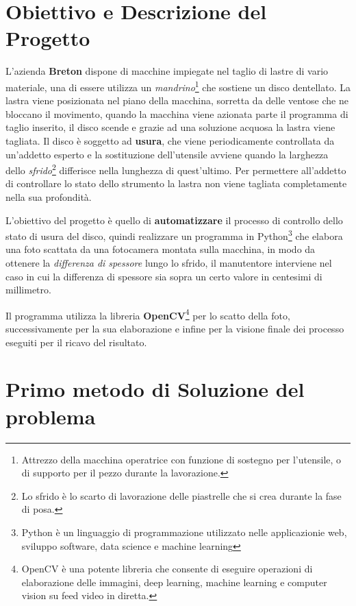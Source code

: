 \documentclass[a4paper, notitlepage, 12pt]{article}
\begin{document}
    \section{Obiettivo e Descrizione  del Progetto}\par
        \noindent L'azienda \textbf{Breton} dispone di macchine impiegate nel taglio di lastre di vario materiale,
        una di essere utilizza un \emph{mandrino}\footnote[0]{\indent Attrezzo della macchina operatrice con funzione di sostegno per l'utensile, o di supporto per il pezzo durante la lavorazione.} che sostiene un disco dentellato.
        La lastra viene posizionata nel piano della macchina, sorretta da delle ventose che ne bloccano il movimento,
        quando la macchina viene azionata parte il programma di taglio inserito, il disco scende e grazie ad una
        soluzione acquosa la lastra viene tagliata. Il disco è soggetto ad \textbf{usura}, che viene periodicamente controllata da un'addetto esperto e la 
        sostituzione dell'utensile avviene quando la larghezza dello \emph{sfrido}\footnote[1]{\indent Lo sfrido è lo scarto di lavorazione delle piastrelle che si crea durante la fase di posa.} differisce
        nella lunghezza di quest'ultimo. Per permettere all'addetto di controllare lo stato dello strumento la lastra
        non viene tagliata completamente nella sua profondità.\par
        \noindent L'obiettivo del progetto è quello di \textbf{automatizzare} il processo di controllo dello stato di usura 
        del disco, quindi realizzare un programma in Python\footnote[2]{\indent Python è un linguaggio di programmazione utilizzato nelle applicazionie web, sviluppo software, data science e machine learning} che elabora una foto 
        scattata da una fotocamera montata sulla macchina, in modo da ottenere la \emph{differenza di spessore} lungo lo sfrido, 
        il manutentore interviene nel caso in cui la differenza di spessore sia sopra un certo valore in centesimi di millimetro.\par
        \noindent Il programma utilizza la libreria \textbf{OpenCV}\footnote[3]{\indent OpenCV è una potente libreria che consente di eseguire operazioni di elaborazione delle immagini, deep learning, machine learning e computer vision su feed video in diretta.} per lo scatto della foto, successivamente 
        per la sua elaborazione e infine per la visione finale dei processo eseguiti per il ricavo del risultato.
    \pagebreak
    \begin{abstract}
        \noindent \rule{\linewidth}{.6pt}\par

        \noindent \rule{\linewidth}{.6pt} 
    \end{abstract}    
    \section{Primo metodo di Soluzione del problema}
\end{document}
